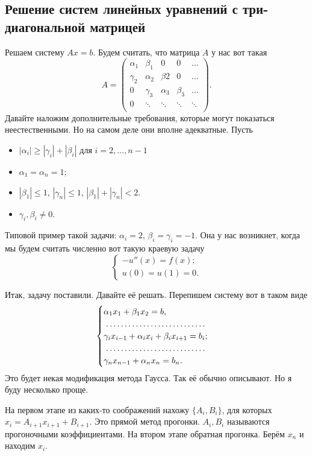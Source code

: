 \subsection{Решение систем линейных уравнений с три-диагональной матрицей}
Решаем систему $Ax = b$. Будем считать, что матрица $A$ у нас вот такая
\[
 A = \begin{pmatrix}
   \alpha_1 & \beta_1   & 0         & 0     & \dots\\
   \gamma_2 & \alpha_2  & \beta 2   & 0     & \dots\\
   0        & \gamma_3  & \alpha_3  & \beta_3 &\dots\\
   0        & \ddots    & \ddots    & \ddots & \ddots\\
 \end{pmatrix}.
\]
Давайте наложим дополнительные требования, которые могут показаться неестественными. Но на самом деле они вполне адекватные. Пусть 
\begin{itemize}
\item $|\alpha_i|\ge |\gamma_i| + |\beta_i|$ для $i=2,\dots, n-1$
\item $\alpha_1 = \alpha_n=1$;
\item $|\beta_1|\le 1$, $|\gamma_n|\le 1$, $|\beta_1| + |\gamma_n|<2$.
\item $\gamma_i,\beta_i\ne0$.
\end{itemize}

Типовой пример такой задачи: $\alpha_i = 2$, $\beta_i = \gamma_i = -1$. Она у нас возникнет, когда мы будем считать численно вот такую краевую задачу
\[
  \begin{cases}
    -u''(x) = f(x);\\
    u(0) = u(1) = 0.
  \end{cases}
\]

Итак, задачу поставили. Давайте её решать. Перепишем систему вот в таком виде
\[
 \begin{cases}\alpha_1 x_1 + \beta_1 x_2 = b,\\
 \dotfill\\
 \gamma_i x_{i-1} + \alpha_i x_i + \beta_i x_{i+1} = b_i;\\
 \dotfill\\
\gamma_n x_{n-1} + \alpha_n x_n = b_n.
\end{cases}
\]
Это будет некая модификация метода Гаусса. Так её обычно описывают. Но я буду несколько проще.

На первом этапе из каких-то соображений нахожу $\{A_i,B_i\}$, для которых $x_i = A_{i+1} x_{i+1}  + B_{i+1}$. Это прямой метод прогонки. $A_i,B_i$ называются прогоночными коэффициентами. На втором этапе обратная прогонка. Берём $x_n$ и находим $x_i$.

